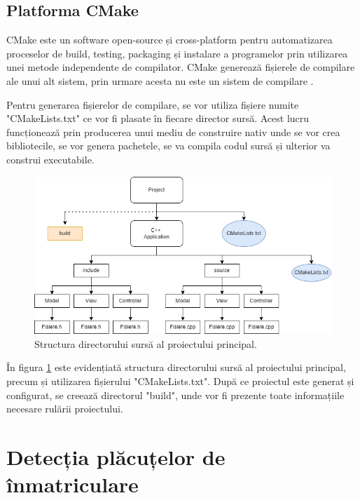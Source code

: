 \documentclass[12pt]{article}
\begin{document}
\subsection{Platforma CMake}
CMake este un software open-source și cross-platform pentru automatizarea proceselor de build, testing, packaging și instalare a programelor prin utilizarea unei metode independente de compilator. CMake genereaz\u{a} fișierele de compilare ale unui alt sistem, prin urmare acesta nu este un sistem de compilare \cite{cmake}.

Pentru generarea fișierelor de compilare, se vor utiliza fișiere numite "CMakeLists.txt" ce vor fi plasate \^{i}n fiecare director surs\u{a}. Acest lucru funcționeaz\u{a} prin producerea unui mediu de construire nativ unde se vor crea bibliotecile, se vor genera pachetele, se va compila codul surs\u{a} și ulterior va construi executabile.

\begin{figure}[H]
  \centering
  \includegraphics[width=0.8\linewidth]{structura_cmake.png}
  \caption{Structura directorului surs\u{a} al proiectului principal.}
  \label{fig:structura_cmake}
\end{figure}


\^{I}n figura \ref{fig:structura_cmake} este evidențiat\u{a} structura directorului surs\u{a} al proiectului principal, precum și utilizarea fișierului "CMakeLists.txt". Dup\u{a} ce proiectul este generat și configurat, se creeaz\u{a} directorul "build", unde vor fi prezente toate informațiile necesare rul\u{a}rii proiectului.

\newpage

\section{Detecția pl\u{a}cuțelor de \^{i}nmatriculare}
\end{document}
